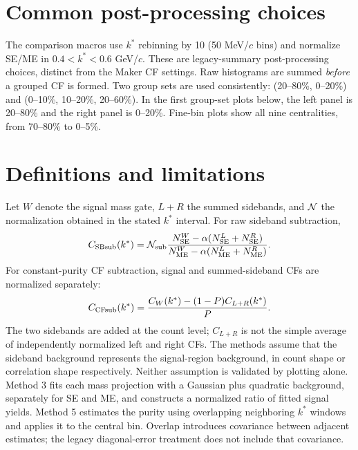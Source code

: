 \documentclass[11pt,a4paper]{article}
\begin{document}
\section{Common post-processing choices}
The comparison macros use $k^*$ rebinning by 10 (50 MeV/$c$ bins) and normalize SE/ME in $0.4<k^*<0.6$ GeV/$c$. These are legacy-summary post-processing choices, distinct from the Maker CF settings. Raw histograms are summed \emph{before} a grouped CF is formed.
Two group sets are used consistently: (20--80\%, 0--20\%) and (0--10\%, 10--20\%, 20--60\%). In the first group-set plots below, the left panel is 20--80\% and the right panel is 0--20\%. Fine-bin plots show all nine centralities, from 70--80\% to 0--5\%.
\clearpage\section{Definitions and limitations}
Let $W$ denote the signal mass gate, $L+R$ the summed sidebands, and ${\cal N}$ the normalization obtained in the stated $k^*$ interval. For raw sideband subtraction,
\begin{equation}C_{\rm SBsub}(k^*)={\cal N}_{\rm sub}\frac{N_{\rm SE}^{W}-\alpha(N_{\rm SE}^{L}+N_{\rm SE}^{R})}{N_{\rm ME}^{W}-\alpha(N_{\rm ME}^{L}+N_{\rm ME}^{R})}.\end{equation}
For constant-purity CF subtraction, signal and summed-sideband CFs are normalized separately:
\begin{equation}C_{\rm CFsub}(k^*)=\frac{C_W(k^*)-(1-P)C_{L+R}(k^*)}{P}.\end{equation}
The two sidebands are added at the count level; $C_{L+R}$ is not the simple average of independently normalized left and right CFs. The methods assume that the sideband background represents the signal-region background, in count shape or correlation shape respectively. Neither assumption is validated by plotting alone.
Method 3 fits each mass projection with a Gaussian plus quadratic background, separately for SE and ME, and constructs a normalized ratio of fitted signal yields. Method 5 estimates the purity using overlapping neighboring $k^*$ windows and applies it to the central bin. Overlap introduces covariance between adjacent estimates; the legacy diagonal-error treatment does not include that covariance.
\end{document}

